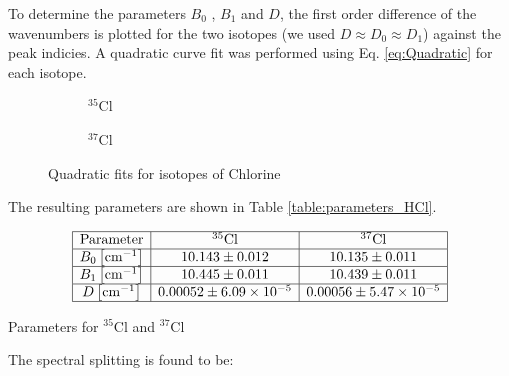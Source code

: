 \documentclass{article}
\begin{document}
To determine the parameters $B_0$ , $B_1$ and $D$, the first order difference of the wavenumbers is plotted for the two isotopes (we used $D \approx D_0 \approx D_1$) against the peak indicies. A quadratic curve fit was performed using Eq. \ref{eq:Quadratic} for each isotope.

\begin{figure}[H]
	\centering
	\begin{subfigure}{0.45\textwidth}
		\centering
		\scalebox{0.50}{}
		\caption{$^{35}$Cl}
		\label{fig:Quadratic_fit_Cl35}
	\end{subfigure}
	\hspace{0.5cm}
	\begin{subfigure}{0.45\textwidth}
		\centering
		\scalebox{0.50}{}
		\caption{$^{37}$Cl}
		\label{fig:Quadratic_fit_Cl37}
	\end{subfigure}
	\caption{Quadratic fits for isotopes of Chlorine}
\end{figure}

The resulting parameters are shown in Table \ref{table:parameters_HCl}.

\begin{table}[h!]
    \centering
    \[
    \begin{array}{|c|c|c|}
    \hline \text{Parameter} &^{35} \mathrm{Cl} & ^{37} \mathrm{Cl} \\
    \hline B_0\left[\mathrm{cm}^{-1}\right] & 10.143 \pm 0.012 & 10.135 \pm 0.011 \\
    \hline B_1\left[\mathrm{cm}^{-1}\right] & 10.445 \pm 0.011 & 10.439 \pm 0.011 \\
    \hline D\left[\mathrm{cm}^{-1}\right] & 0.00052 \pm 6.09 \times 10^{-5} &  0.00056 \pm 5.47 \times 10^{-5} \\
    \hline
    \end{array}
    \]
    \caption{Parameters for $^{35} \mathrm{Cl}$ and $^{37} \mathrm{Cl}$}
    \label{table:parameters_HCl}
\end{table}

The spectral splitting is found to be: 

\begin{table}[h!]
    \centering
    \caption{Values of the splitting between the two isotopes}
    \label{table:splitting_values}
\end{table}
\end{document}
